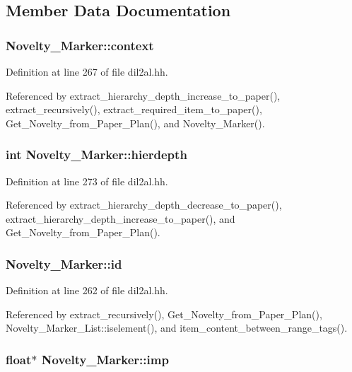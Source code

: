 \subsection{Member Data Documentation}
\subsubsection{ Novelty\_\-Marker::context}\label{classNovelty__Marker_m4}




Definition at line 267 of file dil2al.hh.

Referenced by extract\_\-hierarchy\_\-depth\_\-increase\_\-to\_\-paper(), extract\_\-recursively(), extract\_\-required\_\-item\_\-to\_\-paper(), Get\_\-Novelty\_\-from\_\-Paper\_\-Plan(), and Novelty\_\-Marker().
\subsubsection{\setlength{\rightskip}{0pt plus 5cm}int Novelty\_\-Marker::hierdepth}\label{classNovelty__Marker_m9}




Definition at line 273 of file dil2al.hh.

Referenced by extract\_\-hierarchy\_\-depth\_\-decrease\_\-to\_\-paper(), extract\_\-hierarchy\_\-depth\_\-increase\_\-to\_\-paper(), and Get\_\-Novelty\_\-from\_\-Paper\_\-Plan().
\subsubsection{ Novelty\_\-Marker::id}\label{classNovelty__Marker_m0}




Definition at line 262 of file dil2al.hh.

Referenced by extract\_\-recursively(), Get\_\-Novelty\_\-from\_\-Paper\_\-Plan(), Novelty\_\-Marker\_\-List::iselement(), and item\_\-content\_\-between\_\-range\_\-tags().
\subsubsection{\setlength{\rightskip}{0pt plus 5cm}float$\ast$ Novelty\_\-Marker::imp}\label{classNovelty__Marker_m5}




